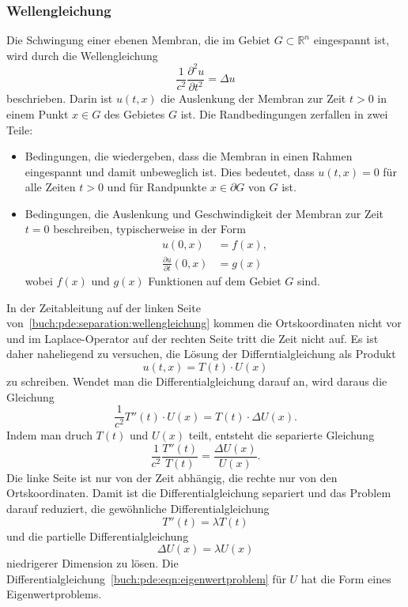 \subsubsection{Wellengleichung}
Die Schwingung einer ebenen Membran, die im Gebiet
$G\subset\mathbb{R}^n$ eingespannt ist, wird durch die
Wellengleichung
\begin{equation}
\frac{1}{c^2} \frac{\partial^2 u}{\partial t^2} = \Delta u
\label{buch:pde:separation:wellengleichung}
\end{equation}
beschrieben.
Darin ist $u(t,x)$ die Auslenkung der Membran zur Zeit $t>0$ in einem
Punkt $x\in G$ des Gebietes $G$ ist.
Die Randbedingungen zerfallen in zwei Teile:
\begin{itemize}
\item
Bedingungen, die wiedergeben, dass die Membran in einen 
Rahmen eingespannt und damit unbeweglich ist.
Dies bedeutet, dass $u(t,x)=0$ für alle Zeiten $t>0$ und für 
Randpunkte $x\in\partial G$ von $G$ ist.
\item
Bedingungen, die Auslenkung und Geschwindigkeit der Membran zur
Zeit $t=0$ beschreiben, typischerweise in der Form
\begin{align*}
u(0,x) &= f(x),
\\
\frac{\partial u}{\partial t}(0,x) &= g(x)
\end{align*}
wobei $f(x)$ und $g(x)$ Funktionen auf dem Gebiet $G$ sind.
\end{itemize}

In der Zeitableitung auf der linken Seite
von~\eqref{buch:pde:separation:wellengleichung}
kommen die Ortskoordinaten nicht vor und im Laplace-Operator
auf der rechten Seite tritt die Zeit nicht auf.
Es ist daher naheliegend zu versuchen, die Lösung der Differntialgleichung
als Produkt
\[
u(t,x) = T(t) \cdot U(x)
\]
zu schreiben.
Wendet man die Differentialgleichung darauf an, wird daraus die Gleichung
\[
\frac{1}{c^2}
T''(t)\cdot U(x)
=
T(t) \cdot \Delta U(x).
\]
Indem man druch $T(t)$ und $U(x)$ teilt, entsteht die separierte Gleichung
\[
\frac{1}{c^2} \frac{T''(t)}{T(t)}
=
\frac{\Delta U(x)}{U(x)}.
\]
Die linke Seite ist nur von der Zeit abhängig, die rechte nur von den
Ortskoordinaten.
Damit ist die Differentialgleichung separiert und das Problem darauf
reduziert, die gewöhnliche Differentialgleichung 
\[
T''(t) = \lambda T(t)
\]
und die partielle Differentialgleichung
\begin{equation}
\Delta U(x) = \lambda U(x)
\label{buch:pde:eqn:eigenwertproblem}
\end{equation}
niedrigerer Dimension zu lösen.
Die Differentialgleichung~\eqref{buch:pde:eqn:eigenwertproblem}
für $U$ hat die Form eines Eigenwertproblems.

